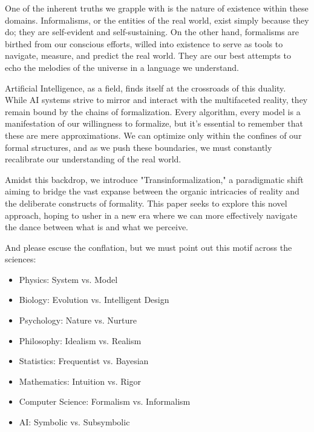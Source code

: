 One of the inherent truths we grapple with is the nature of existence within these domains. Informalisms, or the entities of the real world, exist simply because they do; they are self-evident and self-sustaining. On the other hand, formalisms are birthed from our conscious efforts, willed into existence to serve as tools to navigate, measure, and predict the real world. They are our best attempts to echo the melodies of the universe in a language we understand.

Artificial Intelligence, as a field, finds itself at the crossroads of this duality. While AI systems strive to mirror and interact with the multifaceted reality, they remain bound by the chains of formalization. Every algorithm, every model is a manifestation of our willingness to formalize, but it's essential to remember that these are mere approximations. We can optimize only within the confines of our formal structures, and as we push these boundaries, we must constantly recalibrate our understanding of the real world.

Amidst this backdrop, we introduce "Transinformalization," a paradigmatic shift aiming to bridge the vast expanse between the organic intricacies of reality and the deliberate constructs of formality. This paper seeks to explore this novel approach, hoping to usher in a new era where we can more effectively navigate the dance between what is and what we perceive.


And please escuse the conflation, but we must point out this motif across the sciences:

\begin{itemize}
    \item Physics: System vs. Model
    \item Biology: Evolution vs. Intelligent Design
    \item Psychology: Nature vs. Nurture
    \item Philosophy: Idealism vs. Realism
    \item Statistics: Frequentist vs. Bayesian
    \item Mathematics: Intuition vs. Rigor
    \item Computer Science: Formalism vs. Informalism
    \item AI: Symbolic vs. Subsymbolic
\end{itemize}